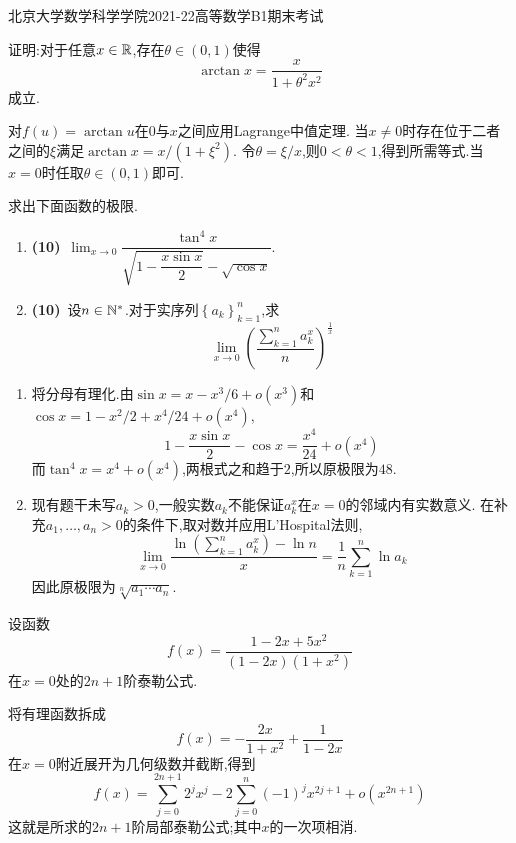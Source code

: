 \documentclass{ctexart}
\begin{document}
\pagestyle{empty}
\begin{center}\Large
北京大学数学科学学院2021-22高等数学B1期末考试
\end{center}
\begin{problem}[1.(10\songti{分})]
证明:对于任意$x\in\mathbb{R}$,存在$\theta\in(0,1)$使得
        \[\arctan x=\dfrac{x}{1+\theta^2x^2}\]
        成立.
\end{problem}
\begin{solution}
对$f(u)=\arctan u$在$0$与$x$之间应用Lagrange中值定理.
当$x\neq0$时存在位于二者之间的$\xi$满足$\arctan x=x/(1+\xi^2)$.
令$\theta=\xi/x$,则$0<\theta<1$,得到所需等式.当$x=0$时任取$\theta\in(0,1)$即可.
\end{solution}
\begin{problem}[2.(20\songti{分})]
求出下面函数的极限.
        \begin{enumerate}[label=\textbf{(\arabic*)},leftmargin=*]
            \item \textbf{(10)}\ $\displaystyle\lim_{x\to0}\dfrac{\tan^4x}{\sqrt{1-\dfrac{x\sin x}{2}}-\sqrt{\cos x}}$.
            \item \textbf{(10)}\ 设$n\in\mathbb{N}^*$.对于实序列$\left\{a_k\right\}_{k=1}^n$,求\[\lim_{x\to0}\left(\dfrac{\sum_{k=1}^na_k^x}{n}\right)^{\frac{1}{x}}\]
        \end{enumerate}
\end{problem}
\begin{solution}
\begin{enumerate}[label=\tbf{(\arabic*)},leftmargin=*]
\item 将分母有理化.由$\sin x=x-x^3/6+o(x^3)$和$\cos x=1-x^2/2+x^4/24+o(x^4)$,
\[1-\dfrac{x\sin x}{2}-\cos x=\dfrac{x^4}{24}+o(x^4)\]
而$\tan^4x=x^4+o(x^4)$,两根式之和趋于$2$,所以原极限为$48$.
\item 现有题干未写$a_k>0$,一般实数$a_k$不能保证$a_k^x$在$x=0$的邻域内有实数意义.
在补充$a_1,\ldots,a_n>0$的条件下,取对数并应用L'Hospital法则,
\[\lim_{x\to0}\dfrac{\ln(\sum_{k=1}^n a_k^x)-\ln n}{x}
=\dfrac1n\sum_{k=1}^n\ln a_k\]
因此原极限为$\sqrt[n]{a_1\cdots a_n}$.
\end{enumerate}
\end{solution}
\begin{problem}[3.(15\songti{分})]
设函数\[f(x)=\dfrac{1-2x+5x^2}{(1-2x)(1+x^2)}\]在$x=0$处的$2n+1$阶泰勒公式.
\end{problem}
\begin{solution}
将有理函数拆成
\[f(x)=-\dfrac{2x}{1+x^2}+\dfrac1{1-2x}\]
在$x=0$附近展开为几何级数并截断,得到
\[f(x)=\sum_{j=0}^{2n+1}2^jx^j-2\sum_{j=0}^n(-1)^jx^{2j+1}+o(x^{2n+1})\]
这就是所求的$2n+1$阶局部泰勒公式;其中$x$的一次项相消.
\end{solution}
\end{document}
